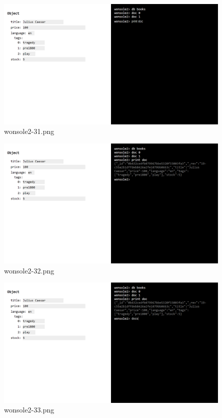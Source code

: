 \clearpage
\begin{figure}
\includegraphics[width=\textwidth]{screenshot/wonsole2/wonsole2-31.png}
\caption{wonsole2-31.png}
\label{wonsole2-31.png}
\end{figure}


\begin{figure}
\includegraphics[width=\textwidth]{screenshot/wonsole2/wonsole2-32.png}
\caption{wonsole2-32.png}
\label{wonsole2-32.png}
\end{figure}


\clearpage
\begin{figure}
\includegraphics[width=\textwidth]{screenshot/wonsole2/wonsole2-33.png}
\caption{wonsole2-33.png}
\label{wonsole2-33.png}
\end{figure}


